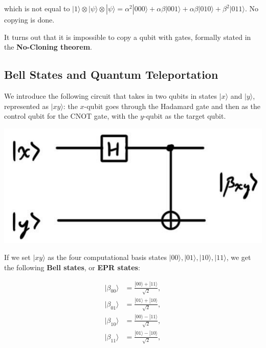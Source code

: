 \documentclass{article}
\theoremstyle{definition}
\begin{document}
\begin{enumerate}
      which is not equal to $|1\rangle \otimes |\psi \rangle \otimes |\psi\rangle = \alpha^2 |000\rangle + \alpha \beta |001 \rangle + \alpha \beta |010\rangle + \beta^2 |011\rangle$. No copying is done.
    \end{enumerate}

    It turns out that it is impossible to copy a qubit with gates, formally stated in the \textbf{No-Cloning theorem}.

  \subsection{Bell States and Quantum Teleportation}

    We introduce the following circuit that takes in two qubits in states $|x\rangle$ and $|y\rangle$, represented as $|xy\rangle$: the $x$-qubit goes through the Hadamard gate and then as the control qubit for the CNOT gate, with the $y$-qubit as the target qubit.

    \begin{center}
      \includegraphics[scale=0.3]{img/Bell_state_circuit_generator.jpg}
    \end{center}

    If we set $|xy\rangle$ as the four computational basis states $|00\rangle, |01\rangle, |10\rangle, |11\rangle$, we get the following \textbf{Bell states}, or \textbf{EPR states}:

    \begin{align*}
      |\beta_{00} \rangle & = \frac{|00\rangle + |11\rangle}{\sqrt{2}}, \\
      |\beta_{01} \rangle & = \frac{|01\rangle + |10\rangle}{\sqrt{2}}, \\
      |\beta_{10} \rangle & = \frac{|00\rangle - |11\rangle}{\sqrt{2}}, \\
      |\beta_{11} \rangle & = \frac{|01\rangle - |10\rangle}{\sqrt{2}},
    \end{align*}
\end{document}

